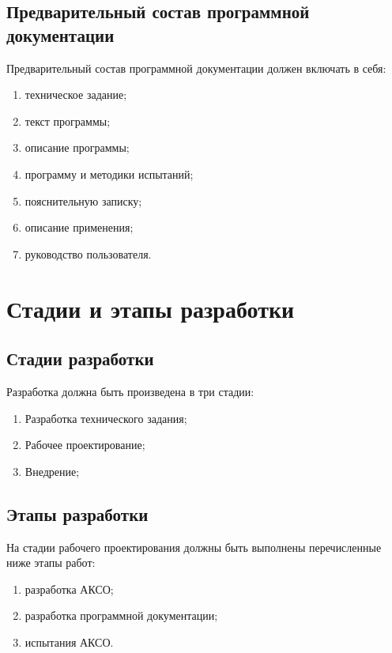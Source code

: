 \documentclass[a4paper,14pt]{extreport}
\begin{document}
	\subsection{Предварительный состав программной документации}
	\label{subsection:documentation}
	Предварительный состав программной документации должен включать в себя\cite{gost-19.105-78,gost-19.106-78}:
\begin{enumerate}
	\item техническое задание;
	\item текст программы;
	\item описание программы;
	\item программу и методики испытаний;
	\item пояснительную записку\cite{methodVKR,methodVKR2,methodVKRUrFU};
	\item описание применения;
	\item руководство пользователя.
\end{enumerate}
	
	\section{Стадии и этапы разработки}
	
	\subsection{Стадии разработки}
	
	Разработка должна быть произведена в три стадии\cite{gost-19.102-77}:
	\begin{enumerate}
		\item Разработка технического задания;
		\item Рабочее проектирование;
		\item Внедрение;
	\end{enumerate}
	
	\subsection{Этапы разработки}
	На стадии рабочего проектирования должны быть выполнены перечисленные ниже этапы работ:
	\begin{enumerate}
		\item разработка АКСО; 
		\item разработка программной документации; 
		\item испытания АКСО.
	\end{enumerate}
	
\end{document}
